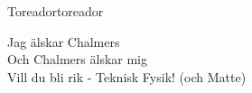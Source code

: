 \begin{song}{Toreador}{toreador}
\begin{vers}
Jag älskar Chalmers\\
Och Chalmers älskar mig\\
Vill du bli rik - Teknisk Fysik! (och Matte)\\
\end{vers}
\end{song}
